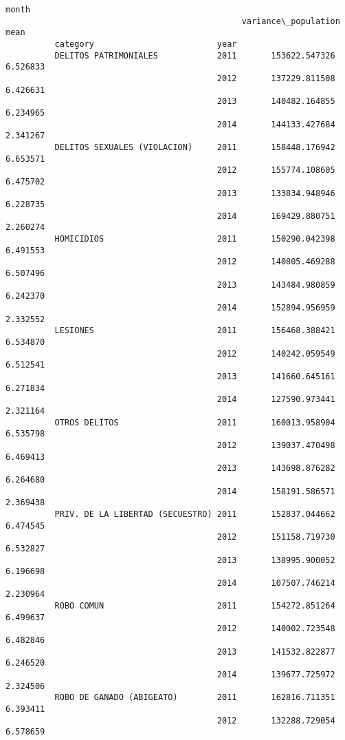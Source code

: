 \documentclass[11pt]{article}
\begin{document}
\begin{Verbatim}[commandchars=\\\{\}]
                                                                        month  
                                                variance\_population      mean  
          category                         year                                
          DELITOS PATRIMONIALES            2011       153622.547326  6.526833  
                                           2012       137229.811508  6.426631  
                                           2013       140482.164855  6.234965  
                                           2014       144133.427684  2.341267  
          DELITOS SEXUALES (VIOLACION)     2011       158448.176942  6.653571  
                                           2012       155774.108605  6.475702  
                                           2013       133834.948946  6.228735  
                                           2014       169429.880751  2.260274  
          HOMICIDIOS                       2011       150290.042398  6.491553  
                                           2012       140805.469288  6.507496  
                                           2013       143484.980859  6.242370  
                                           2014       152894.956959  2.332552  
          LESIONES                         2011       156468.388421  6.534870  
                                           2012       140242.059549  6.512541  
                                           2013       141660.645161  6.271834  
                                           2014       127590.973441  2.321164  
          OTROS DELITOS                    2011       160013.958904  6.535798  
                                           2012       139037.470498  6.469413  
                                           2013       143698.876282  6.264680  
                                           2014       158191.586571  2.369438  
          PRIV. DE LA LIBERTAD (SECUESTRO) 2011       152837.044662  6.474545  
                                           2012       151158.719730  6.532827  
                                           2013       138995.900052  6.196698  
                                           2014       107507.746214  2.230964  
          ROBO COMUN                       2011       154272.851264  6.499637  
                                           2012       140002.723548  6.482846  
                                           2013       141532.822877  6.246520  
                                           2014       139677.725972  2.324506  
          ROBO DE GANADO (ABIGEATO)        2011       162816.711351  6.393411  
                                           2012       132288.729054  6.578659  

\end{Verbatim}
\end{document}

